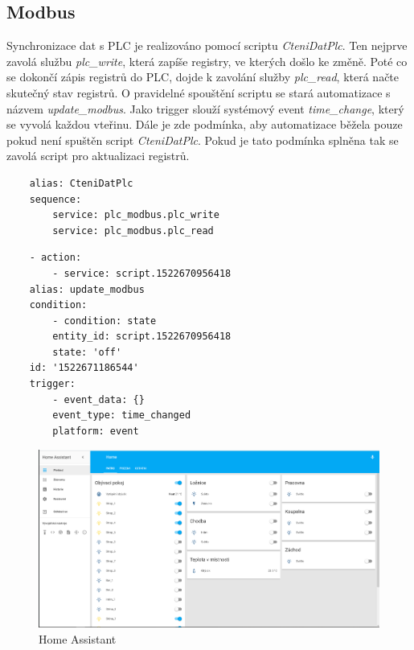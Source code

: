 \documentclass[a4paper,12pt,czech,bibliography=totoc]{scrbook}
\begin{document}
	\subsection{Modbus}
	Synchronizace dat s PLC je realizováno pomocí scriptu \textit{CteniDatPlc}. Ten nejprve zavolá službu \textit{plc\_write}, která zapíše registry, ve kterých došlo ke změně. Poté co se dokončí zápis registrů do PLC, dojde k zavolání služby \textit{plc\_read}, která načte skutečný stav registrů.
\newline
O pravidelné spouštění scriptu se stará automatizace s názvem \textit{update\_modbus}. Jako trigger slouží systémový event \textit{time\_change}, který se vyvolá každou vteřinu. Dále je zde podmínka, aby automatizace běžela pouze pokud není spuštěn script \textit{CteniDatPlc}. Pokud je tato podmínka splněna tak se zavolá script pro aktualizaci registrů.

	\begin{lstlisting}
	alias: CteniDatPlc
	sequence:
		service: plc_modbus.plc_write
		service: plc_modbus.plc_read
	\end{lstlisting}
	\begin{lstlisting}
	- action:
		- service: script.1522670956418
	alias: update_modbus
	condition:
		- condition: state
		entity_id: script.1522670956418
		state: 'off'
	id: '1522671186544'
	trigger:
		- event_data: {}
		event_type: time_changed
		platform: event
	\end{lstlisting}
	\begin{figure}[h]
	\centering
	\includegraphics[scale = 0.3]{home.PNG}
	\caption{Home Assistant}
	\label{fig:my_label}
\end{figure}
\end{document}

